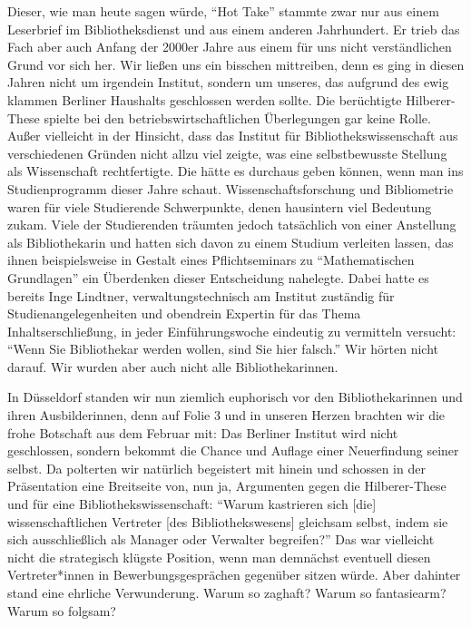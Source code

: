 Dieser, wie man heute sagen würde, \enquote{Hot Take} stammte zwar nur
aus einem Leserbrief im Bibliotheksdienst und aus einem anderen
Jahrhundert. Er trieb das Fach aber auch Anfang der 2000er Jahre aus
einem für uns nicht verständlichen Grund vor sich her. Wir ließen uns
ein bisschen mittreiben, denn es ging in diesen Jahren nicht um
irgendein Institut, sondern um unseres, das aufgrund des ewig klammen
Berliner Haushalts geschlossen werden sollte. Die berüchtigte
Hilberer-These spielte bei den betriebswirtschaftlichen Überlegungen gar
keine Rolle. Außer vielleicht in der Hinsicht, dass das Institut für
Bibliothekswissenschaft aus verschiedenen Gründen nicht allzu viel
zeigte, was eine selbstbewusste Stellung als Wissenschaft rechtfertigte.
Die hätte es durchaus geben können, wenn man ins Studienprogramm dieser
Jahre schaut. Wissenschaftsforschung und Bibliometrie waren für viele
Studierende Schwerpunkte, denen hausintern viel Bedeutung zukam. Viele
der Studierenden träumten jedoch tatsächlich von einer Anstellung als
Bibliothekarin und hatten sich davon zu einem Studium verleiten lassen,
das ihnen beispielsweise in Gestalt eines Pflichtseminars zu
\enquote{Mathematischen Grundlagen} ein Überdenken dieser Entscheidung
nahelegte. Dabei hatte es bereits Inge Lindtner, verwaltungstechnisch am
Institut zuständig für Studienangelegenheiten und obendrein Expertin für
das Thema Inhaltserschließung, in jeder Einführungswoche eindeutig zu
vermitteln versucht: \enquote{Wenn Sie Bibliothekar werden wollen, sind
Sie hier falsch.} Wir hörten nicht darauf. Wir wurden aber auch nicht
alle Bibliothekarinnen.

In Düsseldorf standen wir nun ziemlich euphorisch vor den
Bibliothekarinnen und ihren Ausbilderinnen, denn auf Folie 3 und in
unseren Herzen brachten wir die frohe Botschaft aus dem Februar mit: Das
Berliner Institut wird nicht geschlossen, sondern bekommt die Chance und
Auflage einer Neuerfindung seiner selbst. Da polterten wir natürlich
begeistert mit hinein und schossen in der Präsentation eine Breitseite
von, nun ja, Argumenten gegen die Hilberer-These und für eine
Bibliothekswissenschaft: \enquote{Warum kastrieren sich {[}die{]}
wissenschaftlichen Vertreter {[}des Bibliothekswesens{]} gleichsam
selbst, indem sie sich ausschließlich als Manager oder Verwalter
begreifen?} Das war vielleicht nicht die strategisch klügste Position,
wenn man demnächst eventuell diesen Vertreter*innen in
Bewerbungsgesprächen gegenüber sitzen würde. Aber dahinter stand eine
ehrliche Verwunderung. Warum so zaghaft? Warum so fantasiearm? Warum so
folgsam?

